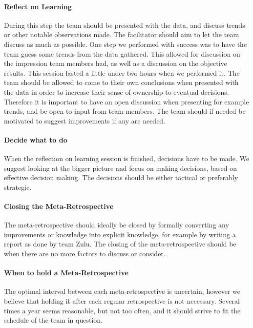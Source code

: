 \paragraph{Reflect on Learning}
During this step the team should be presented with the data, and discuss trends or other notable observations made. The facilitator should aim to let the team discuss as much as possible. One step we performed with success was to have the team guess some trends from the data gathered. This allowed for discussion on the impression team members had, as well as a discussion on the objective results. This session lasted a little under two hours when we performed it. The team should be allowed to come to their own conclusions when presented with the data in order to increase their sense of ownership to eventual decisions. Therefore it is important to have an open discussion when presenting for example trends, and be open to input from team members. The team should if needed be motivated to suggest improvements if any are needed.

\paragraph{Decide what to do}
When the reflection on learning session is finished, decisions have to be made. We suggest looking at the bigger picture and focus on making decisions, based on effective decision making. The decisions should be either tactical or preferably strategic. 

\paragraph{Closing the Meta-Retrospective} %
\label{par:paragraph_name}
The meta-retrospective should ideally be closed by formally converting any improvements or knowledge into explicit knowledge, for example by writing a report as done by team Zulu. The closing of the meta-retrospective should be when there are no more factors to discuss or consider.

\paragraph{When to hold a Meta-Retrospective}
The optimal interval between each meta-retrospective is uncertain, however we believe that holding it after each regular retrospective is not necessary. Several times a year seems reasonable, but not too often, and it should strive to fit the schedule of the team in question.

